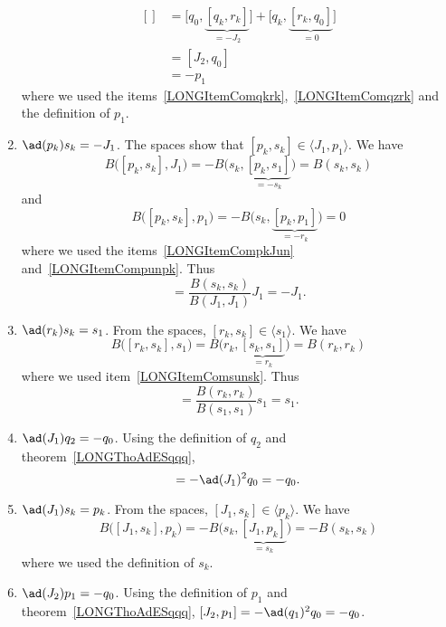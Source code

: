 \begin{enumerate}
\begin{equation}
\begin{aligned}[]
			          & =\big[ q_0,\underbrace{[q_k,r_k]}_{=-J_2} \big]+\big[ q_k,\underbrace{[r_k,q_0]}_{=0} \big] \\
			          & =[J_2,q_0]                                                                                  \\
			          & =-p_1
		\end{aligned}
	\end{equation}
	where we used the items~\ref{LONGItemComqkrk},~\ref{LONGItemComqzrk} and the definition of $p_1$.
	\item$\ad(p_k)s_k=-J_1$. The spaces show that $[p_k,s_k]\in\langle J_1,p_1\rangle$. We have
	\begin{equation}
		B\big( [p_k,s_k],J_1 \big)=-B\big( s_k,\underbrace{[p_k,s_1]}_{=-s_k} \big)=B(s_k,s_k)
	\end{equation}
	and
	\begin{equation}
		B\big( [p_k,s_k],p_1 \big)=-B\big( s_k,\underbrace{[p_k,p_1]}_{=-r_k} \big)=0
	\end{equation}
	where we used the items~\ref{LONGItemCompkJun} and~\ref{LONGItemCompunpk}. Thus
	\begin{equation}
		[p_k,s_k]=\frac{ B(s_k,s_k) }{ B(J_1,J_1) }J_1=-J_1.
	\end{equation}
	\item$\ad(r_k)s_k=s_1$. From the spaces, $[r_k,s_k]\in\langle s_1\rangle$. We have
	\begin{equation}
		B\big( [r_k,s_k],s_1 \big)=B\big( r_k,\underbrace{[s_k,s_1]}_{=r_k} \big)=B(r_k,r_k)
	\end{equation}
	where we used item~\ref{LONGItemComsunsk}. Thus
	\begin{equation}
		[r_k,s_k]=\frac{ B(r_k,r_k) }{ B(s_1,s_1) }s_1=s_1.
	\end{equation}
	\item$\ad(J_1)q_2=-q_0$. Using the definition of $q_2$ and theorem~\ref{LONGThoAdESqqq},
	\begin{equation}
		[J_1,q_2]=-\ad(J_1)^2q_0=-q_0.
	\end{equation}
	\item$\ad(J_1)s_k=p_k$. From the spaces, $[J_1,s_k]\in\langle p_k\rangle$. We have
	\begin{equation}
		B\big( [J_1,s_k],p_k \big)=-B\big( s_k,\underbrace{[J_1,p_k]}_{=s_k} \big)=-B(s_k,s_k)
	\end{equation}
	where we used the definition of $s_k$.
	\item$\ad(J_2)p_1=-q_0$\label{LONGItemComJdeuxpun}. Using the definition of $p_1$ and theorem~\ref{LONGThoAdESqqq}, $[J_2,p_1]=-\ad(q_1)^2q_0=-q_0$.

\end{enumerate}
